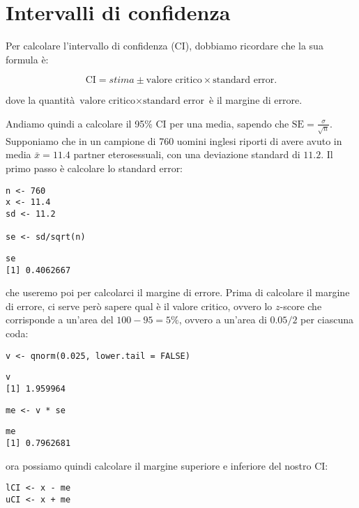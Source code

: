 \section{Intervalli di confidenza}
\label{sec:CI}

Per calcolare l'intervallo di confidenza (CI), dobbiamo ricordare che la sua formula \`e:

$$
\text{CI} = stima \pm \text{valore critico} \times \text{standard error}.
$$

\noindent dove la quantit\`a $\text{valore critico} \times \text{standard error}$ \`e il margine di errore.


\noindent Andiamo quindi a calcolare il 95\% CI per una media, sapendo che $\text{SE} = \frac{\sigma}{\sqrt{n}}$.
%
Supponiamo che in un campione di 760 uomini inglesi riporti di avere avuto in media $\bar{x} = 11.4$ partner eterosessuali, con una deviazione standard di $11.2$. Il primo passo \`e calcolare lo standard error:


\begin{lstlisting}[style=Rstylescript]
n <- 760
x <- 11.4
sd <- 11.2

se <- sd/sqrt(n)
\end{lstlisting}

\begin{lstlisting}[style=Rstyle]
se
[1] 0.4062667
\end{lstlisting}
%
che useremo poi per calcolarci il margine di errore. Prima di calcolare il margine di errore, ci serve per\`o sapere qual \`e il valore critico, ovvero lo $z$-score che corrisponde a un'area del $100-95=5\%$, ovvero a un'area di $0.05/2$ per ciascuna coda:

\begin{lstlisting}[style=Rstylescript]
v <- qnorm(0.025, lower.tail = FALSE)
\end{lstlisting}

\begin{lstlisting}[style=Rstyle]
v
[1] 1.959964
\end{lstlisting}

\begin{lstlisting}[style=Rstylescript]
me <- v * se
\end{lstlisting}

\begin{lstlisting}[style=Rstyle]
me
[1] 0.7962681
\end{lstlisting}
%
ora possiamo quindi calcolare il margine superiore e inferiore del nostro CI:

\begin{lstlisting}[style=Rstylescript]
lCI <- x - me
uCI <- x + me
\end{lstlisting}

